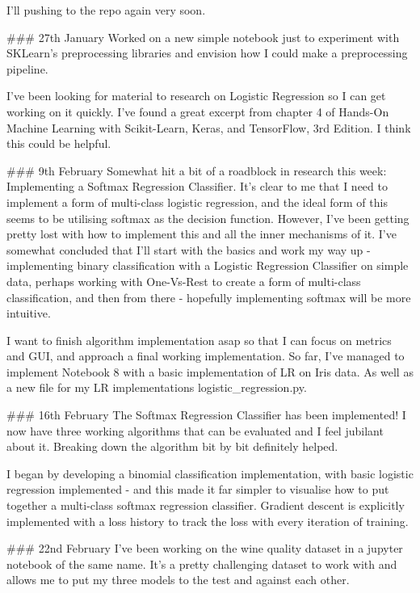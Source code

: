 \documentclass[letterpaper,10pt]{article}
\begin{document}
\begin{markdown}
I'll pushing to the repo again very soon. 

### 27th January
Worked on a new simple notebook just to experiment with SKLearn's preprocessing libraries and envision how I could make a preprocessing pipeline.  
  
I've been looking for material to research on Logistic Regression so I can get working on it quickly. I've found a great excerpt from chapter 4 of 
Hands-On Machine Learning with Scikit-Learn, Keras, and TensorFlow, 3rd Edition. I think this could be helpful.  

### 9th February
Somewhat hit a bit of a roadblock in research this week: Implementing a Softmax Regression Classifier.  
It's clear to me that I need to implement a form of multi-class logistic regression, and the ideal form of this seems to be utilising softmax as the decision function. However, I've been getting pretty lost with how to implement this and all the inner mechanisms of it.  
I've somewhat concluded that I'll start with the basics and work my way up - implementing binary classification with a Logistic Regression Classifier on simple data, perhaps working with One-Vs-Rest to create a form of multi-class classification, and then from there - hopefully implementing softmax will be more intuitive.  
  
I want to finish algorithm implementation asap so that I can focus on metrics and GUI, and approach a final working implementation. So far, I've managed to implement Notebook 8 with a basic implementation of LR on Iris data. As well as a new file for my LR implementations logistic_regression.py.

### 16th February
The Softmax Regression Classifier has been implemented! I now have three working algorithms that can be evaluated and I feel jubilant about it. Breaking down the algorithm bit by bit definitely helped.  
  
I began by developing a binomial classification implementation, with basic logistic regression implemented - and this made it far simpler to visualise how to put together a multi-class softmax regression classifier. Gradient descent is explicitly implemented with a loss history to track the loss with every iteration of training. 


### 22nd February
I've been working on the wine quality dataset in a jupyter notebook of the same name. It's a pretty challenging dataset to work with and allows me to put my three models to the test and against each other.
  

\end{markdown}
\end{document}
